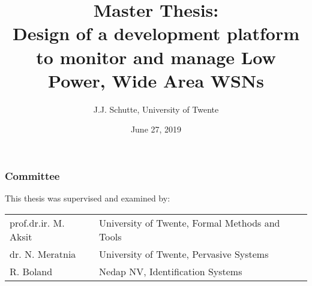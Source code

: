 \documentclass[a4paper, 10pt, conference]{report}
\begin{document}
\author{J.J. Schutte, University of Twente}
\date{June 27, 2019}
\title{Master Thesis:\\Design of a development platform to monitor and manage Low Power, Wide Area WSNs}
\maketitle
{}
\subsubsection*{Committee}
This thesis was supervised and examined by:
\begin{table}[h]
\begin{tabular}{ll}
prof.dr.ir. M. Aksit & University of Twente, Formal Methods and Tools \\
dr. N. Meratnia & University of Twente, Pervasive Systems\\
R. Boland & Nedap NV, Identification Systems \\
\end{tabular}
\end{table}
\newpage
\tableofcontents
\newpage






\end{document}
